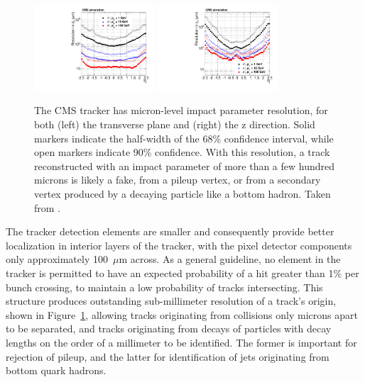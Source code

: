   \begin{figure}[h!]
    \centering
    \includegraphics[width=0.4\textwidth]{figures/pi/resolutionD0VsEta.pdf}
    \includegraphics[width=0.4\textwidth]{figures/pi/resolutionDzVsEta.pdf}
    \caption[Impact parameter resolution in the CMS tracker.]{
      The CMS tracker has micron-level impact parameter resolution, for both (left) the transverse plane and (right) the z direction.
      Solid markers indicate the half-width of the 68\% confidence interval, while open markers indicate 90\% confidence.
      With this resolution, a track reconstructed with an impact parameter of more than a few hundred microns is likely a fake, from a pileup vertex, or from a secondary vertex produced by a decaying particle like a bottom hadron.
      Taken from \cite{cmstracking}.}
    \label{fig:trackresolution}
  \end{figure}  

  The tracker detection elements are smaller and consequently provide better localization in interior layers of the tracker, with the pixel detector components only approximately 100~$\mu$m across.
  As a general guideline, no element in the tracker is permitted to have an expected probability of a hit greater than 1\% per bunch crossing, to maintain a low probability of tracks intersecting.
  This structure produces outstanding sub-millimeter resolution of a track's origin, shown in Figure~\ref{fig:trackresolution}, allowing tracks originating from collisions only microns apart to be separated, and tracks originating from decays of particles with decay lengths on the order of a millimeter to be identified.
  The former is important for rejection of pileup, and the latter for identification of jets originating from bottom quark hadrons.

